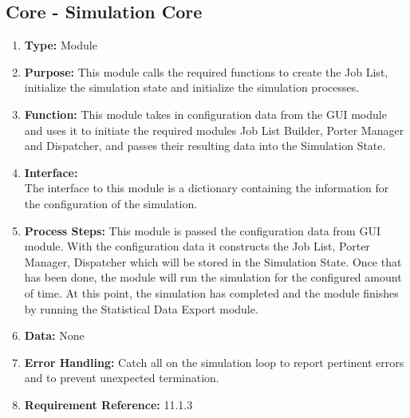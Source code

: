 \documentclass[paper=letter, fontsize=10pt]{scrartcl}
\numberwithin{equation}{section}		%
\numberwithin{figure}{section}			%
\numberwithin{table}{section}				%
\begin{document}
\subsection{Core - Simulation Core}
\begin{enumerate}[]
	\item \textbf{Type:} Module
	\item \textbf{Purpose:} This module calls the required functions to create the Job List, initialize the simulation state and initialize the simulation processes.
	\item \textbf{Function:} This module takes in configuration data from the GUI module and uses it to initiate the required modules Job List Builder, Porter Manager and Dispatcher, and passes their resulting data into the Simulation State.
	\item \textbf{Interface:}\\ 
	The interface to this module is a dictionary containing the information for the configuration of the simulation.
	
	\item \textbf{Process Steps:} This module is passed the configuration data from GUI module. With the configuration data it constructs the Job List, Porter Manager, Dispatcher which will be stored in the Simulation State. Once that has been done, the module will run the simulation for the configured amount of time. At this point, the simulation has completed and the module finishes by running the Statistical Data Export module.
	\item \textbf{Data:} None
	\item \textbf{Error Handling:} Catch all on the simulation loop to report pertinent errors and to prevent unexpected termination. 
	\item \textbf{Requirement Reference:} 11.1.3
\end{enumerate}
\end{document}
